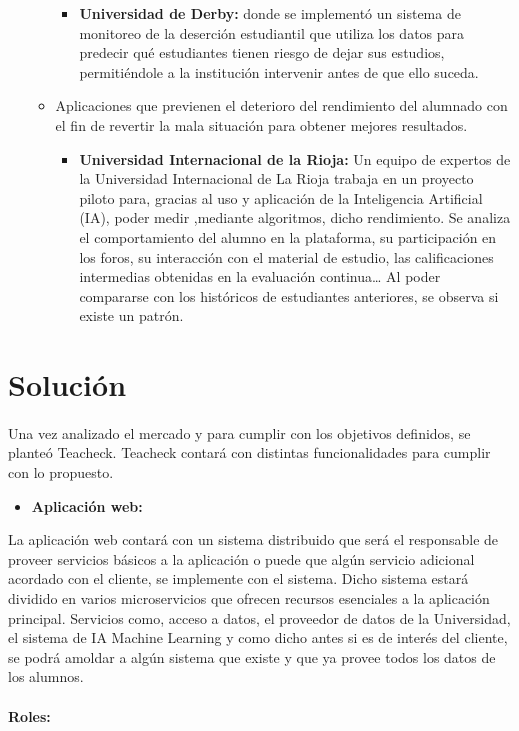 \begin{itemize}
\begin{itemize}
\begin{itemize}
\item \textbf{Universidad de Derby:} donde se implementó un sistema de
  monitoreo de la deserción estudiantil que utiliza los datos para
  predecir qué estudiantes tienen riesgo de dejar sus estudios,
  permitiéndole a la institución intervenir antes de que ello
  suceda.\cite{riesgoDejarEstudios}
\end{itemize}
\item Aplicaciones que previenen el deterioro del rendimiento del
  alumnado con el fin de revertir la mala situación para obtener
  mejores resultados.
\begin{itemize}
\item \textbf{Universidad Internacional de la Rioja:} Un equipo de
  expertos de la Universidad Internacional de La Rioja trabaja en un
  proyecto piloto para, gracias al uso y aplicación de la Inteligencia
  Artificial (IA), poder medir ,mediante algoritmos, dicho
  rendimiento. Se analiza el comportamiento del alumno en la
  plataforma, su participación en los foros, su interacción con el
  material de estudio, las calificaciones intermedias obtenidas en la
  evaluación continua… Al poder compararse con los históricos de
  estudiantes anteriores, se observa si existe un
  patrón.\cite{rendimientoAlumnos}	
\end{itemize}
\end{itemize}
\end{itemize}

\section{Solución}

\paragraph{}
Una vez analizado el mercado y para cumplir con los objetivos definidos, se planteó Teacheck. Teacheck contará con distintas funcionalidades para cumplir con lo propuesto.
\begin{itemize}
\item{\textbf{Aplicación web: }}
\end{itemize}
La aplicación web contará con un sistema distribuido que será el responsable de proveer servicios básicos a la aplicación o puede que algún servicio adicional acordado con el cliente, se implemente con el sistema. Dicho sistema estará dividido en varios microservicios que ofrecen recursos esenciales a la aplicación principal. Servicios como, acceso a datos, el proveedor de datos de la Universidad, el sistema de IA Machine Learning y como dicho antes si es de interés del cliente, se podrá amoldar a algún sistema que existe y que ya provee todos los datos de los alumnos.\\
\\
\textbf{Roles:}
